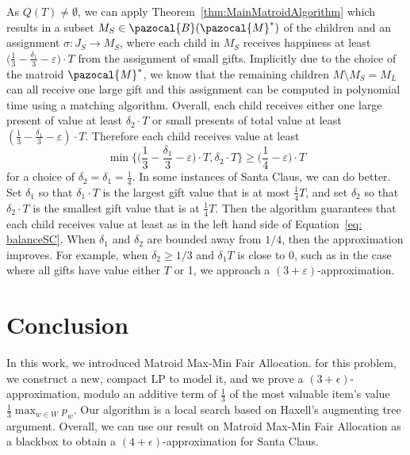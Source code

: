  



As $Q(T) \neq \emptyset$, we can apply Theorem~\ref{thm:MainMatroidAlgorithm} 
which results in a subset $M_S \in \pazocal{B}(\pazocal{M}^*) $
 of the children and an assignment $\sigma : J_S \to M_S$, 
where each child in $M_S$ receives happiness at least 
$ \big(\frac13 - \frac{\delta_1}{3} - \varepsilon \big) \cdot T$ from the assignment of small gifts.
Implicitly due to the choice of the matroid $\pazocal{M}^*$, 
we know that the remaining children $M \setminus M_S = M_L$ can all receive one large gift
and this assignment can be computed in polynomial time using a matching algorithm. 
Overall, each child receives either one large present of value
at least $\delta_2 \cdot T$ or small presents of total value at least $(\frac{1}{3} - \frac{\delta_1}{3}-\varepsilon ) \cdot T$. 
Therefore each child receives value at least
\begin{equation}\label{eq: balanceSC}
  \min\Big\{ \Big(\frac{1}{3}-\frac{\delta_1}{3}-\varepsilon\Big) \cdot T, \delta_2 \cdot T \Big\} \geq \Big(\frac{1}{4}-\varepsilon\Big) \cdot T
\end{equation}
for a choice of $\delta_2 = \delta_1=\frac{1}{4}$. 
In some instances of Santa Claus, we can do better. 
Set $\delta_1$ so that $\delta_1 \cdot T$ is the largest gift value
that is at most $\frac14 T$, and set $\delta_2$ so that $\delta_2 \cdot T$ 
is the smallest gift value that is at $\frac14 T$.
Then the algorithm guarantees that each child receives value at least 
as in the left hand side of Equation~\ref{eq: balanceSC}. 
When $\delta_1$ and $\delta_2$ are bounded away from $1/4$,
then the approximation improves. 
For example, when $\delta_2 \geq 1/3$ and $\delta_1 T$ is close to 0,
such as in the case where all gifts have value either $T$ or 1,
we approach a $(3+\varepsilon)$-approximation.

\section{Conclusion}
In this work, we introduced Matroid Max-Min Fair Allocation. 
for this problem, we construct a new, compact LP to model it, 
and we prove a $(3+\epsilon)$-approximation, modulo an additive term of $\frac13$ of the most valuable item's value $\frac13 \max_{w \in W} p_w$.
Our algorithm is a local search based on Haxell's augmenting tree argument.
Overall, we can use our result on Matroid Max-Min Fair Allocation as a blackbox to obtain a $(4+\epsilon)$-approximation for Santa Claus.



